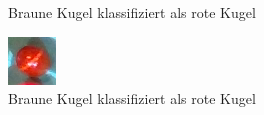 \begin{figure}[h]
\begin{subfigure}[t]{0.2\textwidth}
                \caption{Braune Kugel klassifiziert als rote Kugel}
                \label{fig:classification_results_failed_classification_RED_BROWN_3_original}
        \end{subfigure}
        \hfill
        \begin{subfigure}[t]{0.2\textwidth}
                \raggedright
                \includegraphics[width=1.0\linewidth]{../common/04_results/resources/classification/failed_classification_RED_BROWN_6_original.png}
                \caption{Braune Kugel klassifiziert als rote Kugel}
                \label{fig:classification_results_failed_classification_RED_BROWN_6_original}
        \end{subfigure}
        \hfill
        \begin{subfigure}[t]{0.2\textwidth}
                \centering

\end{subfigure}
\end{figure}
